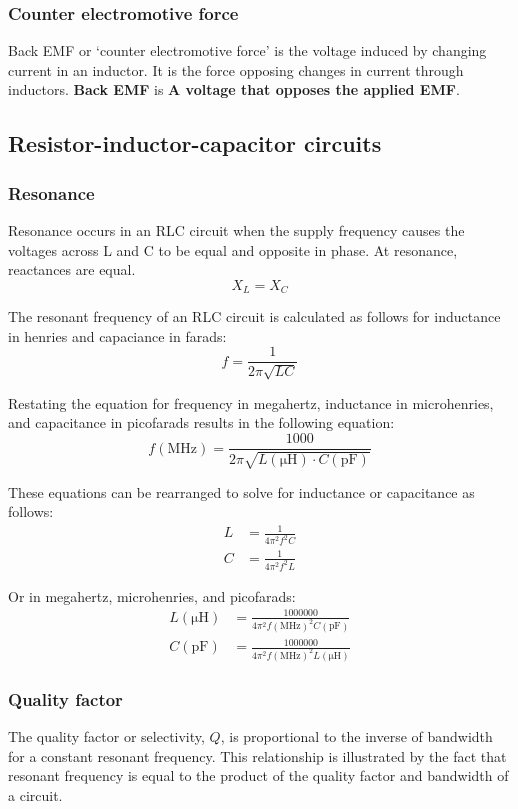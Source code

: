 \documentclass[letterpaper]{article}
\begin{document}
        \subsubsection{Counter electromotive force}
        Back EMF or `counter electromotive force' is the voltage induced by changing current in an inductor. It is the force opposing changes in current through inductors.
        \textbf{Back EMF} is \textbf{A voltage that opposes the applied EMF}.

        \newpage

        \subsection{Resistor-inductor-capacitor circuits}
        \subsubsection{Resonance}
        Resonance occurs in an RLC circuit when the supply frequency causes the voltages across L and C to be equal and opposite in phase.
        At resonance, reactances are equal.
        $$ X_L = X_C $$

        The resonant frequency of an RLC circuit is calculated as follows for inductance in henries and capaciance in farads:
        $$ f = \frac{1}{2 \pi \sqrt{LC}} $$

        Restating the equation for frequency in megahertz, inductance in microhenries, and capacitance in picofarads results in the following equation:
        $$ f(\mathrm{MHz}) = \frac{1000}{2 \pi \sqrt{L (\mathrm{\mu H}) \cdot C (\mathrm{p F})}} $$

        These equations can be rearranged to solve for inductance or capacitance as follows:
        \begin{align*}
            L &= \frac{1}{4 \pi^2 f^2 C} \\
            C &= \frac{1}{4 \pi^2 f^2 L}
        \end{align*}

        Or in megahertz, microhenries, and picofarads:
        \begin{align*}
            L (\mathrm{\mu H}) &= \frac{1000000}{4 \pi^2 f (\mathrm{MHz})^2 C (\mathrm{p F})} \\
            C (\mathrm{p F}) &= \frac{1000000}{4 \pi^2 f (\mathrm{MHz})^2 L (\mathrm{\mu H})}
        \end{align*}

        \subsubsection{Quality factor}
        The quality factor or selectivity, $ Q $, is proportional to the inverse of bandwidth for a constant resonant frequency.
        This relationship is illustrated by the fact that resonant frequency is equal to the product of the quality factor and bandwidth of a circuit.
        
\end{document}
